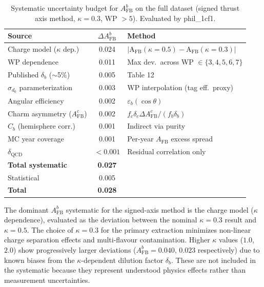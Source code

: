 \documentclass[11pt,a4paper]{article}
\begin{document}
\begin{table}[htbp]
\centering
\caption{Systematic uncertainty budget for $A_\text{FB}^b$ on the
full dataset (signed thrust axis method, $\kappa = 0.3$, WP $> 5$).
Evaluated by phil\_1cf1.}
\label{tbl:syst_afb_signed}
\begin{tabular}{lcl}
\toprule
Source & $\Delta A_\text{FB}^b$ & Method \\
\midrule
Charge model ($\kappa$ dep.)       & 0.024 & $|\text{A}_\text{FB}(\kappa{=}0.5) - \text{A}_\text{FB}(\kappa{=}0.3)|$ \\
WP dependence                       & 0.011 & Max dev.\ across WP $\in \{3,4,5,6,7\}$ \\
Published $\delta_b$ ($\sim$5\%)   & 0.005 & \cite{LEP:EWWG:2005} Table 12 \\
$\sigma_{d_0}$ parameterization    & 0.003 & WP interpolation (tag eff.\ proxy) \\
Angular efficiency                  & 0.002 & $\varepsilon_b(\cos\theta)$~\cite{LEP:EWWG:2005} \\
Charm asymmetry ($A_\text{FB}^c$)  & 0.002 & $f_c \delta_c \Delta A_\text{FB}^c / (f_b \delta_b)$ \\
$C_b$ (hemisphere corr.)           & 0.001 & Indirect via purity \\
MC year coverage                    & 0.001 & Per-year $A_\text{FB}$ excess spread \\
$\delta_\text{QCD}$                & $< 0.001$ & Residual correlation only \\
\midrule
\textbf{Total systematic}          & \textbf{0.027} & \\
Statistical                         & 0.005 & \\
\textbf{Total}                      & \textbf{0.028} & \\
\bottomrule
\end{tabular}
\end{table}

The dominant $A_\text{FB}^b$ systematic for the signed-axis method is the
charge model ($\kappa$ dependence), evaluated as the deviation between
the nominal $\kappa = 0.3$ result and $\kappa = 0.5$.
The choice of $\kappa = 0.3$ for the primary extraction minimizes
non-linear charge separation effects and multi-flavour contamination.
Higher $\kappa$ values ($1.0$, $2.0$) show progressively larger deviations
($A_\text{FB}^b = 0.040$, $0.023$ respectively) due to known biases
from the $\kappa$-dependent dilution factor $\delta_b$.
These are not included in the systematic because they represent
understood physics effects rather than measurement uncertainties.
\end{document}
